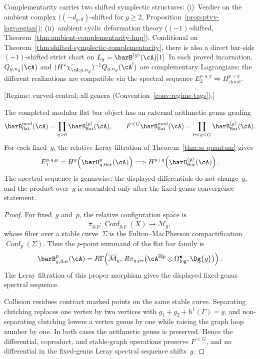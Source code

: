 \begin{remark}\label{rem:ptvv-relation}
Complementarity carries two shifted symplectic structures:
(i)~Verdier on the ambient complex
($(-d_{g,0})$-shifted for $g\geq2$,
Proposition~\ref{prop:ptvv-lagrangian});
(ii)~ambient cyclic deformation theory
($(-1)$-shifted,
Theorem~\ref{thm:ambient-complementarity-fmp}).
Conditional on Theorem~\ref{thm:shifted-symplectic-complementarity},
there is also a direct bar-side $(-1)$-shifted strict chart on
$L_g = \barB^{(g)}(\cA)[1]$. In each proved incarnation,
$Q_{g,n_g}(\cA)$ and
$(H^*\chi^-_{\cA;g,n_g})^{-1}Q_{g,n_g}(\cA^!)$ are complementary
Lagrangians; the
different realizations are compatible via the spectral sequence
$E_2^{p,q,g}\Rightarrow H^{p+q}_{\mathrm{chiral}}$.
\end{remark}

\begin{theorem}\label{thm:ss-genus-stratification}
\textup{[Regime: curved-central; all genera
\textup{(}Convention~\textup{\ref{conv:regime-tags})}.]}

The completed modular flat bar object has an external arithmetic-genus
grading
\[
\barB^{\mathrm{mod}}_{\mathrm{flat}}(\cA)
=
\prod_{g\geq0}\barB^{(g)}_{\mathrm{flat}}(\cA),
\qquad
F^{\leq G}\barB^{\mathrm{mod}}_{\mathrm{flat}}(\cA)
=
\prod_{0\leq g\leq G}\barB^{(g)}_{\mathrm{flat}}(\cA).
\]
For each fixed~$g$, the relative Leray filtration of
Theorem~\textup{\ref{thm:ss-quantum}} gives
\[
E_1^{p,q,g}
=
H^q\!\left(\barB^p_{g,\mathrm{flat}}(\cA)\right)
\Longrightarrow
H^{p+q}\!\left(\barB^{(g)}_{\mathrm{flat}}(\cA)\right).
\]
The spectral sequence is genuswise: the displayed differentials do
not change~$g$, and the product over~$g$ is assembled only after the
fixed-genus convergence statement.
\end{theorem}

\begin{proof}
For fixed~$g$ and~$p$, the relative configuration space is
\[
\pi_{g,p}\colon
\overline{\operatorname{Conf}}_{g,p}(X)
\longrightarrow
\overline{\mathcal M}_g,
\]
whose fiber over a stable curve~$\Sigma$ is the
Fulton--MacPherson compactification
$\overline{\operatorname{Conf}}_p(\Sigma)$. Thus the $p$-point
summand of the flat bar family is
\[
\barB^p_{g,\mathrm{flat}}(\cA)
=
R\Gamma\!\left(
\overline{\mathcal M}_g,\,
R\pi_{g,p*}
\bigl(\cA^{\boxtimes p}\otimes\Omega^\bullet_{\log},\Dg{g}\bigr)
\right).
\]
The Leray filtration of this proper morphism gives the displayed
fixed-genus spectral sequence.

Collision residues contract marked points on the same stable curve.
Separating clutching replaces one vertex by two vertices with
$g_1+g_2+h^1(\Gamma)=g$, and non-separating clutching lowers a
vertex genus by one while raising the graph loop number by one. In
both cases the arithmetic genus is preserved. Hence the differential,
coproduct, and stable-graph operations preserve
$F^{\leq G}$, and no differential in the fixed-genus Leray spectral
sequence shifts~$g$.
\end{proof}


